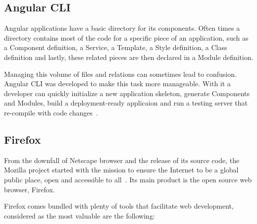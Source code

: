 \subsection{Angular CLI}\label{angularcli}
Angular applications have a basic directory for its components. Often times a directory contains most of the code for a specific piece of an application, such as a Component definition, a Service, a Template, a Style definition, a Class definition and lastly, these related pieces are then declared in a Module definition.

Managing this volume of files and relations can sometimes lead to confusion. Angular \gls{CLI} was developed to make this task more manageable. With it a developer can quickly initialize a new application skeleton, generate Components and Modules, build a deployment-ready applicaion and run a testing server that re-compile with code changes~\cite{angularcli}.

\subsection{Firefox}
From the downfall of Netscape browser and the release of its source code, the Mozilla project started with the mission to ensure the Internet to be a global public place, open and accessible to all~\cite{firemission}. Its main product is the open source web browser, Firefox.

Firefox comes bundled with plenty of tools that facilitate web development, considered as the most valuable are the following:


